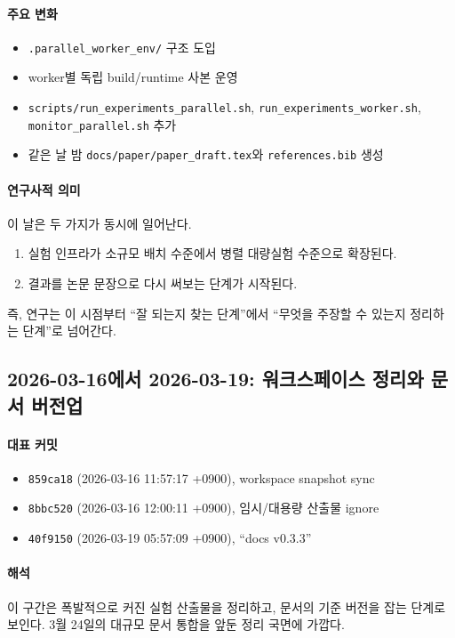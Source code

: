 \documentclass[12pt,a4paper]{article}
\begin{document}
\paragraph{주요 변화}
\begin{itemize}[leftmargin=1.5em]
\item \texttt{.parallel\_worker\_env/} 구조 도입
\item worker별 독립 build/runtime 사본 운영
\item \texttt{scripts/run\_experiments\_parallel.sh},
\texttt{run\_experiments\_worker.sh}, \texttt{monitor\_parallel.sh} 추가
\item 같은 날 밤 \texttt{docs/paper/paper\_draft.tex}와 \texttt{references.bib} 생성
\end{itemize}

\paragraph{연구사적 의미}
이 날은 두 가지가 동시에 일어난다.

\begin{enumerate}[leftmargin=1.5em]
\item 실험 인프라가 소규모 배치 수준에서 병렬 대량실험 수준으로 확장된다.
\item 결과를 논문 문장으로 다시 써보는 단계가 시작된다.
\end{enumerate}

즉, 연구는 이 시점부터 ``잘 되는지 찾는 단계''에서
``무엇을 주장할 수 있는지 정리하는 단계''로 넘어간다.

\subsection{2026-03-16에서 2026-03-19: 워크스페이스 정리와 문서 버전업}

\paragraph{대표 커밋}
\begin{itemize}[leftmargin=1.5em]
\item \texttt{859ca18} (2026-03-16 11:57:17 +0900), workspace snapshot sync
\item \texttt{8bbc520} (2026-03-16 12:00:11 +0900), 임시/대용량 산출물 ignore
\item \texttt{40f9150} (2026-03-19 05:57:09 +0900), ``docs v0.3.3''
\end{itemize}

\paragraph{해석}
이 구간은 폭발적으로 커진 실험 산출물을 정리하고, 문서의 기준 버전을 잡는 단계로
보인다. 3월 24일의 대규모 문서 통합을 앞둔 정리 국면에 가깝다.
\end{document}
